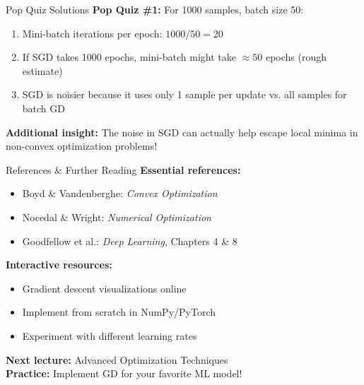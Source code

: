\documentclass[aspectratio=169,11pt]{beamer}
\begin{document}
\begin{frame}{Pop Quiz Solutions}
\textbf{Pop Quiz \#1:} For 1000 samples, batch size 50:
\begin{enumerate}
\item Mini-batch iterations per epoch: $1000/50 = 20$
\item If SGD takes 1000 epochs, mini-batch might take $\approx 50$ epochs (rough estimate)
\item SGD is noisier because it uses only 1 sample per update vs. all samples for batch GD
\end{enumerate}

\pause
\vspace{0.5cm}
\textbf{Additional insight:} The noise in SGD can actually help escape local minima in non-convex optimization problems!
\end{frame}

\begin{frame}{References \& Further Reading}
\textbf{Essential references:}
\begin{itemize}
\item Boyd \& Vandenberghe: \emph{Convex Optimization}
\item Nocedal \& Wright: \emph{Numerical Optimization}
\item Goodfellow et al.: \emph{Deep Learning}, Chapters 4 \& 8
\end{itemize}

\pause
\textbf{Interactive resources:}
\begin{itemize}
\item Gradient descent visualizations online
\item Implement from scratch in NumPy/PyTorch
\item Experiment with different learning rates
\end{itemize}

\pause
\vspace{0.5cm}
\begin{center}
\textbf{Next lecture:} Advanced Optimization Techniques\\
\textbf{Practice:} Implement GD for your favorite ML model!
\end{center}
\end{frame}
\end{document}
